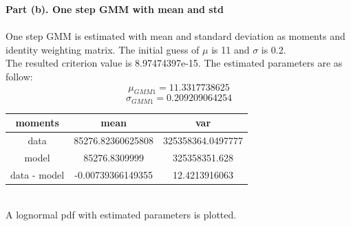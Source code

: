 \documentclass[letterpaper,12pt]{article}
\theoremstyle{definition}
\begin{document}
\clearpage

\noindent\textbf{Part (b). One step GMM with mean and std} \\
\\
One step GMM is estimated with mean and standard deviation as moments and identity weighting matrix. The initial guess of $\mu$ is 11 and $\sigma$ is 0.2.\\
The resulted criterion value is 8.97474397e-15. The estimated parameters are as follow:
\[\mu_{GMM1}= 11.3317738625\]
\[\sigma_{GMM1}= 0.209209064254\]

\begin{center}
\begin{tabular}{ c|c|c }
 moments & mean & var \\
 \hline
 data & 85276.82360625808 & 325358364.0497777 \\
 model & 85276.8309999 & 325358351.628 \\
 data - model & -0.00739366149355 & 12.4213916063
\end{tabular}
\end{center}
\\

A lognormal pdf with estimated parameters is plotted. \\

\begin{figure}[htb]\centering\captionsetup{width=6.0in}
  \caption{\textbf{}}
\end{figure} \\
\end{document}

